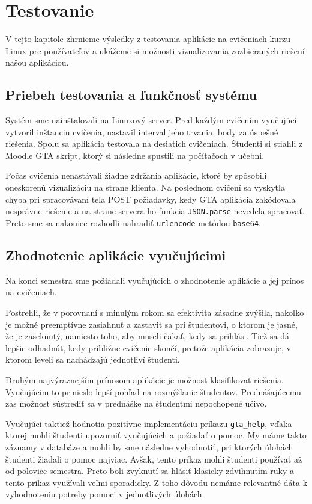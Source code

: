 \chapter{Testovanie}
\label{kap:testovanie}

V tejto kapitole zhrnieme výsledky z testovania aplikácie na cvičeniach kurzu Linux
pre používateľov a ukážeme si možnosti vizualizovania zozbieraných riešení našou aplikáciou.

\section{Priebeh testovania a funkčnosť systému}
\label{sec:funkcnost}

Systém sme nainštalovali na Linuxový server. Pred každým cvičením vyučujúci vytvoril
inštanciu cvičenia, nastavil interval jeho trvania, body za úspešné riešenia.
Spolu sa aplikácia testovala na desiatich cvičeniach. Študenti si stiahli z Moodle
GTA skript, ktorý si následne spustili na počítačoch v učebni.

Počas cvičenia nenastávali žiadne zdržania aplikácie, ktoré by spôsobili oneskorenú
vizualizáciu na strane klienta. Na poslednom cvičení sa vyskytla chyba pri spracovávaní
tela POST požiadavky, kedy GTA aplikácia zakódovala nesprávne riešenie a na strane
servera ho funkcia \verb'JSON.parse' nevedela spracovať. Preto sme sa nakoniec rozhodli
nahradiť \verb'urlencode' metódou \verb'base64'.


\section{Zhodnotenie aplikácie vyučujúcimi}
\label{sec:zhodnotenie}

Na konci semestra sme požiadali vyučujúcich o zhodnotenie aplikácie a jej prínos
na cvičeniach.

Postrehli, že v porovnaní s minulým rokom sa efektivita zásadne zvýšila, nakoľko je možné preemptívne
zasiahnuť a zastaviť sa pri študentovi, o ktorom je jasné, že je zaseknutý, namiesto
toho, aby museli čakať, kedy sa prihlási. Tiež sa dá lepšie odhadnúť,
kedy približne cvičenie skončí, pretože aplikácia zobrazuje, v ktorom leveli sa nachádzajú jednotliví
študenti.

Druhým najvýraznejším prínosom aplikácie je možnosť klasifikovať riešenia.
Vyučujúcim to prinieslo lepší pohľad na rozmýšľanie študentov. Prednášajúcemu zas
možnosť sústrediť sa v prednáške na študentmi nepochopené učivo.

Vyučujúci taktiež hodnotia pozitívne implementáciu príkazu \verb'gta_help', vďaka
ktorej mohli študenti upozorniť vyučujúcich a požiadať o pomoc. My máme takto záznamy
v databáze a mohli by sme následne vyhodnotiť, pri ktorých úlohách študenti žiadali
o pomoc najviac. Avšak, tento príkaz mohli študenti používať až od polovice semestra.
Preto boli zvyknutí sa hlásiť klasicky zdvihnutím ruky a tento príkaz
využívali veľmi sporadicky. Z toho dôvodu nemáme relevantné dáta k vyhodnoteniu
potreby pomoci v jednotlivých úlohách.

